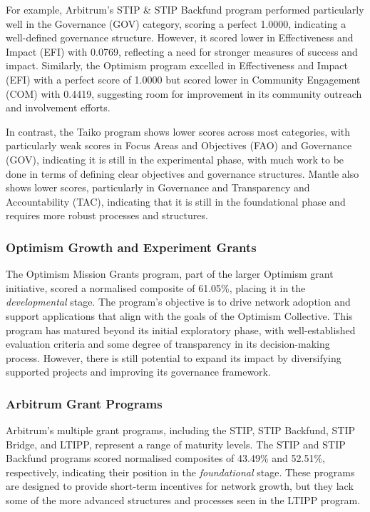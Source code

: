 \documentclass[conference]{IEEEtran}
\begin{document}
For example, Arbitrum's STIP \& STIP Backfund program performed particularly well in the Governance (GOV) category, scoring a perfect 1.0000, indicating a well-defined governance structure. However, it scored lower in Effectiveness and Impact (EFI) with 0.0769, reflecting a need for stronger measures of success and impact. Similarly, the Optimism program excelled in Effectiveness and Impact (EFI) with a perfect score of 1.0000 but scored lower in Community Engagement (COM) with 0.4419, suggesting room for improvement in its community outreach and involvement efforts.

In contrast, the Taiko program shows lower scores across most categories, with particularly weak scores in Focus Areas and Objectives (FAO) and Governance (GOV), indicating it is still in the experimental phase, with much work to be done in terms of defining clear objectives and governance structures. Mantle also shows lower scores, particularly in Governance and Transparency and Accountability (TAC), indicating that it is still in the foundational phase and requires more robust processes and structures.


\subsubsection{Optimism Growth and Experiment Grants}\label{sec_4.2.1}
The Optimism Mission Grants program, part of the larger Optimism grant initiative, scored a normalised composite of 61.05\%, placing it in the \textit{developmental} stage. The program’s objective is to drive network adoption and support applications that align with the goals of the Optimism Collective. This program has matured beyond its initial exploratory phase, with well-established evaluation criteria and some degree of transparency in its decision-making process. However, there is still potential to expand its impact by diversifying supported projects and improving its governance framework.

\subsubsection{Arbitrum Grant Programs}\label{sec_4.2.2}
Arbitrum’s multiple grant programs, including the STIP, STIP Backfund, STIP Bridge, and LTIPP, represent a range of maturity levels. The STIP and STIP Backfund programs scored normalised composites of 43.49\% and 52.51\%, respectively, indicating their position in the \textit{foundational} stage. These programs are designed to provide short-term incentives for network growth, but they lack some of the more advanced structures and processes seen in the LTIPP program.
\end{document}
